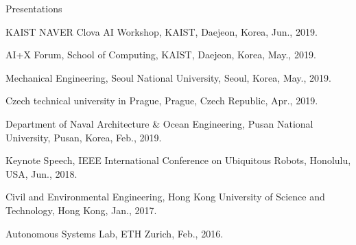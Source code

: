 \begin{rSection}{Presentations}

\begin{pubSubsectionNum}{}
  \item KAIST NAVER Clova AI Workshop, KAIST, Daejeon, Korea, Jun., 2019.

  \item AI+X Forum, School of Computing, KAIST, Daejeon, Korea, May., 2019.


  \item Mechanical Engineering, Seoul National University, Seoul, Korea, May., 2019.

  \item Czech technical university in Prague, Prague, Czech Republic, Apr., 2019.

  \item Department of Naval Architecture \& Ocean Engineering, Pusan National University, Pusan, Korea, Feb., 2019.

  \item Keynote Speech, IEEE International Conference on Ubiquitous Robots, Honolulu, USA, Jun., 2018.


  \item Civil and Environmental Engineering, Hong Kong University of Science and Technology, Hong Kong, Jan., 2017.




  \item Autonomous Systems Lab, ETH Zurich, Feb., 2016.



\end{pubSubsectionNum}
\end{rSection}
